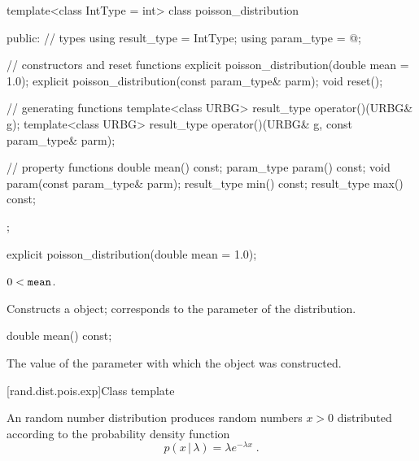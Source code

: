 %
\begin{codeblock}
template<class IntType = int>
 class poisson_distribution
{
public:
 // types
 using result_type = IntType;
 using param_type  = @\unspec@;

 // constructors and reset functions
 explicit poisson_distribution(double mean = 1.0);
 explicit poisson_distribution(const param_type& parm);
 void reset();

 // generating functions
 template<class URBG>
   result_type operator()(URBG& g);
 template<class URBG>
   result_type operator()(URBG& g, const param_type& parm);

 // property functions
 double mean() const;
 param_type param() const;
 void param(const param_type& parm);
 result_type min() const;
 result_type max() const;
};
\end{codeblock}

%
\begin{itemdecl}
explicit poisson_distribution(double mean = 1.0);
\end{itemdecl}

\begin{itemdescr}
\pnum\requires
 $ 0 < \texttt{mean} $.

\pnum\effects Constructs a  object;
 corresponds to the parameter of the distribution.
\end{itemdescr}

%
\begin{itemdecl}
double mean() const;
\end{itemdecl}

\begin{itemdescr}
\pnum\returns The value of the  parameter
 with which the object was constructed.
\end{itemdescr}


[rand.dist.pois.exp]{Class template }%
%
%

\pnum
An  random number distribution
produces random numbers $x > 0$
distributed according to
the probability density function%
%
%
\[%
 p(x\,|\,\lambda)
      = \lambda e^{-\lambda x}
\; \mbox{.}
\]

